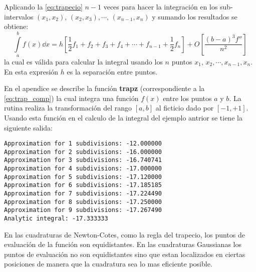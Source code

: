 Aplicando la \cref{eq:trapecio} $n - 1$ veces para hacer la integración en los 
sub-intervalos $(x_1, x_2),\, (x_2,x_3),\cdots,\, (x_{n-1},x_{n})$ y sumando 
los resultados se obtiene:
\begin{equation}
\int\limits_a^b f(x) \dd{x} = h\left[\frac{1}{2}f_1 + f_2 + f_3 + f_4 + \cdots 
+ f_{n-1} + \frac{1}{2}f_n \right]  + O\left[\frac{(b - a)^3 f''}{n^2} \right]
\label{eq:trap_comp}
\end{equation}
la cual es válida para calcular la integral usando los $n$ puntos $x_1,\, 
x_2,\cdots, x_{n- 1 }, x_{n}$. En esta expresión $h$ es la separación entre 
puntos.

En el apendice se describe la función {\bf trapz} (correspondiente a la 
\cref{eq:trap_comp}) la cual integra una función {\bf $f(x)$} entre los puntos $a$ y $b$. La 
rutina realiza la transformación del rango $[a,b]$ al ficticio dado por $[-1, 
+1]$. Usando esta función en el calculo de la integral del ejemplo antrior se tiene la siguiente salida:

\begin{verbatim}
Approximation for 1 subdivisions: -12.000000
Approximation for 2 subdivisions: -16.000000
Approximation for 3 subdivisions: -16.740741
Approximation for 4 subdivisions: -17.000000
Approximation for 5 subdivisions: -17.120000
Approximation for 6 subdivisions: -17.185185
Approximation for 7 subdivisions: -17.224490
Approximation for 8 subdivisions: -17.250000
Approximation for 9 subdivisions: -17.267490
Analytic integral: -17.333333
\end{verbatim}

\begin{tcolorbox}
En las cuadraturas de Newton-Cotes, como la regla del trapecio, los puntos de evaluación de la función son equidistantes. En las cuadraturas Gaussianas los puntos de evaluación no son equidistantes sino que estan localizados en ciertas posiciones de manera que la cuadratura sea lo mas eficiente posible.
\end{tcolorbox}



